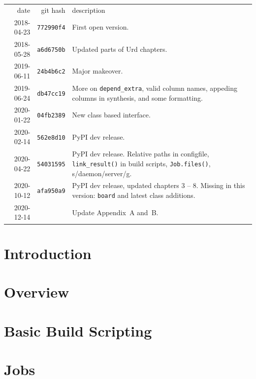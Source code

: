 \documentclass[a4paper]{report}
\newlength{\onechartt}
\newcommand\inputfile[1]{%
    \InputIfFileExists{#1}{}{\typeout{No file #1.}}\hspace{-\onechartt}%
}
\begin{document}
\begin{tabular}{rrp{8cm}}
 date       & git hash          & description\\[0.75ex]
 2018-04-23 & \texttt{772990f4} & First open version.\\
 2018-05-28 & \texttt{a6d6750b} & Updated parts of Urd chapters.\\
 2019-06-11 & \texttt{24b4b6c2} & Major makeover.\\
 2019-06-24 & \texttt{db47cc19} & More on \texttt{depend\_extra}, valid column names, appeding columns in
  synthesis, and some formatting.\\
 2020-01-22 & \texttt{04fb2389} &  New class based interface.\\
 2020-02-14 & \texttt{562e8d10} & PyPI dev release.\\

 2020-04-22 & \texttt{54031595} & PyPI dev release.
 Relative paths in configfile, \texttt{link\_result()} in build
 scripts, \texttt{Job.files()}, s/daemon/server/g.\\

 2020-10-12 & \texttt{afa950a9} & PyPI dev release,
 updated chapters 3 -- 8.  Missing in this version: \texttt{board} and
 latest class additions.\\

 2020-12-14 & \texttt{\inputfile{gitrevision}} & Update Appendix~A and~B.\\
\end{tabular}


\newpage
\tableofcontents

\chapter{Introduction}


\chapter{Overview}


\chapter{Basic Build Scripting}


\chapter{Jobs}

\end{document}
